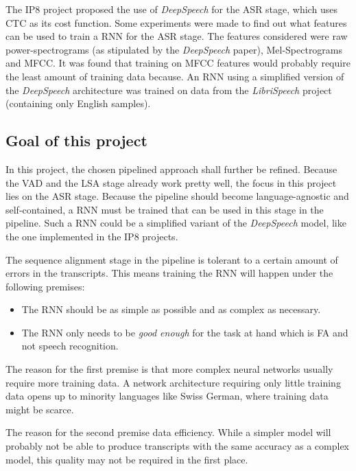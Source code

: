 The IP8 project proposed the use of \textit{DeepSpeech} for the \ac{ASR} stage, which uses \ac{CTC} \parencite{ctc_paper} as its cost function. Some experiments were made to find out what features can be used to train a \ac{RNN} for the \ac{ASR} stage. The features considered were raw power-spectrograms (as stipulated by the \textit{DeepSpeech} paper), Mel-Spectrograms and \ac{MFCC}. It was found that training on \ac{MFCC} features would probably require the least amount of training data because. An \ac{RNN} using a simplified version of the \textit{DeepSpeech} architecture was trained on data from the \textit{LibriSpeech} project (containing only English samples).

\subsection{Goal of this project}

In this project, the chosen pipelined approach shall further be refined. Because the \ac{VAD} and the \ac{LSA} stage already work pretty well, the focus in this project lies on the \ac{ASR} stage. Because the pipeline should become language-agnostic and self-contained, a \ac{RNN} must be trained that can be used in this stage in the pipeline. Such a \ac{RNN} could be a simplified variant of the \textit{DeepSpeech} model, like the one implemented in the IP8 projects. 

The sequence alignment stage in the pipeline is tolerant to a certain amount of errors in the transcripts. This means training the \ac{RNN} will happen under the following premises:

\begin{itemize}
	\item The \ac{RNN} should be as simple as possible and as complex as necessary.
	\item The \ac{RNN} only needs to be \textit{good enough} for the task at hand which is \ac{FA} and not speech recognition.	
\end{itemize}

The reason for the first premise is that more complex neural networks usually require more training data. A network architecture requiring only little training data opens up to minority languages like Swiss German, where training data might be scarce.

The reason for the second premise data efficiency. While a simpler model will probably not be able to produce transcripts with the same accuracy as a complex model, this quality may not be required in the first place. 

